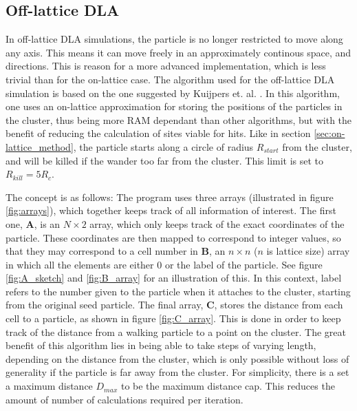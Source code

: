 \subsection{Off-lattice DLA}
In off-lattice DLA simulations, the particle is no longer restricted to move along any axis. This means it can move freely in an approximately continous space, and directions. This is reason for a more advanced implementation, which is less trivial than for the on-lattice case. 
The algorithm used for the off-lattice DLA simulation is based on the one suggested by Kuijpers et. al. \cite{Kuijpers2014841}. In this algorithm, one uses an on-lattice approximation for storing the positions of the particles in the cluster, thus being more RAM dependant than other algorithms, but with the benefit of reducing the calculation of sites viable for hits. Like in section \ref{sec:on-lattice_method}, the particle starts along a circle of radius $R_{start}$ from the cluster, and will be killed if the wander too far from the cluster. This limit is set to $R_{kill} = 5R_c$.

The concept is as follows: The program uses three arrays (illustrated in figure \ref{fig:arrays}), which together keeps track of all information of interest. The first one, $\textbf{A}$, is an $N \times 2$ array, which only keeps track of the exact coordinates of the particle. These coordinates are then mapped to correspond to integer values, so that they may correspond to a cell number in $\textbf{B}$, an $n \times n$ ($n$ is lattice size) array in which all the elements are either $0$ or the label of the particle. See figure \ref{fig:A_sketch} and \ref{fig:B_array} for an illustration of this. In this context, label refers to the number given to the particle when it attaches to the cluster, starting from the original seed particle. The final array, $\textbf{C}$, stores the distance from each cell to a particle, as shown in figure \ref{fig:C_array}. This is done in order to keep track of the distance from a walking particle to a point on the cluster. The great benefit of this algorithm lies in being able to take steps of varying length, depending on the distance from the cluster, which is only possible without loss of generality if the particle is far away from the cluster. For simplicity, there is a set a maximum distance $D_{max}$ to be the maximum distance cap. This reduces the amount of number of calculations required per iteration. 


